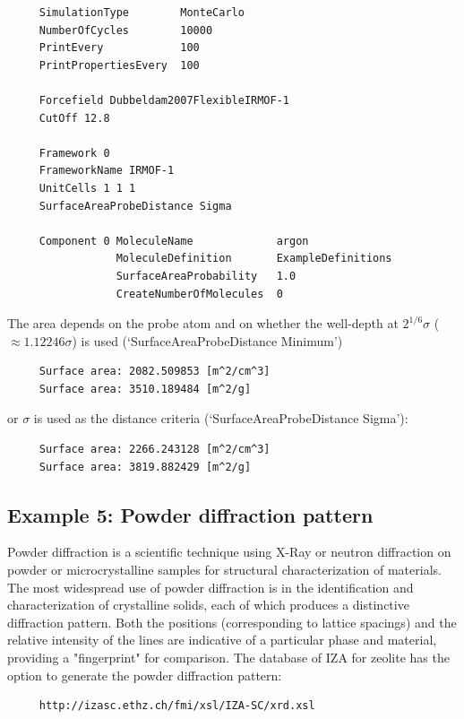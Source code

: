 \begin{tiny}
\begin{verbatim}
     SimulationType        MonteCarlo
     NumberOfCycles        10000
     PrintEvery            100
     PrintPropertiesEvery  100
     
     Forcefield Dubbeldam2007FlexibleIRMOF-1
     CutOff 12.8
     
     Framework 0
     FrameworkName IRMOF-1
     UnitCells 1 1 1
     SurfaceAreaProbeDistance Sigma
     
     Component 0 MoleculeName             argon
                 MoleculeDefinition       ExampleDefinitions
                 SurfaceAreaProbability   1.0
                 CreateNumberOfMolecules  0
\end{verbatim}
\end{tiny}
The area depends on the probe atom and on whether the well-depth at $2^{1/6}\sigma$ ($\approx 1.12246\sigma$)
is used (`SurfaceAreaProbeDistance Minimum')
\begin{tiny}
\begin{verbatim}
     Surface area: 2082.509853 [m^2/cm^3]
     Surface area: 3510.189484 [m^2/g]
\end{verbatim}
\end{tiny}
or $\sigma$ is used as the distance criteria (`SurfaceAreaProbeDistance Sigma'):
\begin{tiny}
\begin{verbatim}
     Surface area: 2266.243128 [m^2/cm^3]
     Surface area: 3819.882429 [m^2/g]
\end{verbatim}
\end{tiny}


\subsection*{Example 5: Powder diffraction pattern}

Powder diffraction is a scientific technique using X-Ray or neutron diffraction on powder or microcrystalline samples
for structural characterization of materials.
The most widespread use of powder diffraction is in the identification and characterization of crystalline solids,
each of which produces a distinctive diffraction pattern. Both the positions (corresponding to lattice spacings) and
the relative intensity of the lines are indicative of a particular phase and material, providing a "fingerprint" for comparison.
The database of IZA for zeolite has the option to generate the powder diffraction pattern:
\begin{tiny}
\begin{verbatim}
     http://izasc.ethz.ch/fmi/xsl/IZA-SC/xrd.xsl
\end{verbatim}
\end{tiny}

